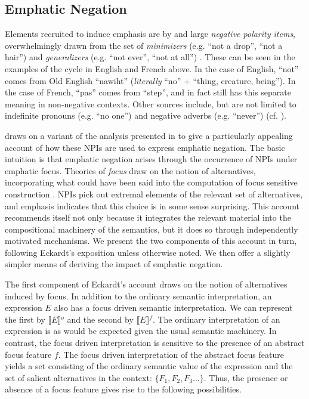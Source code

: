 \documentclass[12pt]{article}
\theoremstyle{definition} \newtheorem{definition}{Definition}
\newcommand{\inter}[1]{\ensuremath{\llbracket#1\rrbracket}}
\begin{document}
\subsection{Emphatic Negation}

Elements recruited to induce emphasis are by and large \emph{negative polarity items}, overwhelmingly drawn from the set of \emph{minimizers} (e.g. ``not a drop'', ``not a hair'') and \emph{generalizers} (e.g. ``not ever'', ``not at all'') \citep{horn:1989}. These can be seen in the examples of the cycle in English and French above. In the case of English, ``not'' comes from Old English ``nawiht'' (\emph{literally} ``no'' + ``thing, creature, being''). In the case of French, ``pas'' comes from ``step'', and in fact still has this separate meaning in non-negative contexts. Other sources include, but are not limited to indefinite pronouns (e.g. ``no one'') and negative adverbs (e.g. ``never'') (cf. \citealt{horn:1989,vanGelderen2008negative}).

\cite{eckardt2006} draws on a variant of the analysis presented in \cite{krifka1995polarity} to give a particularly appealing account of how these NPIs are used to express emphatic negation. The basic intuition is that emphatic negation arises through the occurrence of NPIs under emphatic focus.  Theories of \emph{focus} draw on the notion of alternatives, incorporating what could have been said into the computation of focus sensitive construction \citep{rooth1992}. NPIs pick out extremal elements of the relevant set of alternatives, and emphasis indicates that this choice is in some sense surprising. This account recommends itself not only because it integrates the relevant material into the compositional machinery of the semantics, but it does so through independently motivated mechanisms. We present the two components of this account in turn, following Eckardt's exposition unless otherwise noted. We then offer a slightly simpler means of deriving the impact of emphatic negation.

The first component of Eckardt's account draws on the notion of alternatives induced by focus. In addition to the ordinary semantic interpretation, an expression $E$ also has a focus driven semantic interpretation. We can represent the first by \inter{E}$^o$ and the second by \inter{E}$^f$. The ordinary interpretation of an expression is as would be expected given the usual semantic machinery. In contrast, the focus  driven interpretation is sensitive to the presence of an abstract focus feature $f$. The focus driven interpretation of the abstract focus feature yields a set consisting of the ordinary semantic value of the expression and the set of salient alternatives in the context: $\{F_1, F_2, F_3...\}$.  Thus, the presence or absence of a focus feature gives rise to the following possibilities.
\end{document}
